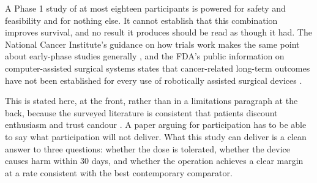 A Phase 1 study of at most eighteen participants is powered for safety and
feasibility and for nothing else. It cannot establish that this combination
improves survival, and no result it produces should be read as though it had.
The National Cancer Institute's guidance on how trials work makes the same point
about early-phase studies generally \cite{NCITrial2024}, and the FDA's public
information on computer-assisted surgical systems states that cancer-related
long-term outcomes have not been established for every use of robotically
assisted surgical devices \cite{FDARobot2022}.

This is stated here, at the front, rather than in a limitations paragraph at the
back, because the surveyed literature is consistent that patients discount
enthusiasm and trust candour \cite{Jauniaux2025, BrarRAS2024X}. A paper arguing
for participation has to be able to say what participation will not deliver.
What this study can deliver is a clean answer to three questions: whether the
dose is tolerated, whether the device causes harm within 30 days, and whether
the operation achieves a clear margin at a rate consistent with the best
contemporary comparator.
